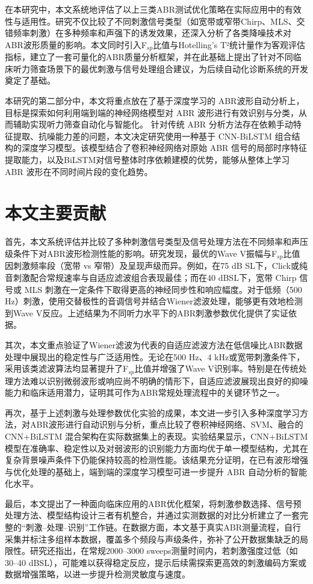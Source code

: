 在本研究中，本文系统地评估了以上三类ABR测试优化策略在实际应用中的有效性与适用性。研究不仅比较了不同刺激信号类型（如宽带或窄带Chirp、MLS、交错频率刺激）在多种频率和声强下的诱发效果，还深入分析了各类降噪技术对ABR波形质量的影响。本文同时引入F$_{sp}$比值与Hotelling's T²统计量作为客观评估指标，建立了一套可量化的ABR质量分析框架，并在此基础上提出了针对不同临床听力筛查场景下的最优刺激与信号处理组合建议，为后续自动化诊断系统的开发奠定了基础。


本研究的第二部分中，本文将重点放在了基于深度学习的 ABR波形自动分析上，目标是探索如何利用端到端的神经网络模型对 ABR 波形进行有效识别与分类，从而辅助实现听力筛查自动化与智能化。
针对传统 ABR 分析方法存在依赖手动特征提取、抗噪能力差的问题，本文决定研究使用一种基于 CNN-BiLSTM 组合结构的深度学习模型。该模型结合了卷积神经网络对原始 ABR 信号的局部时序特征提取能力，以及BiLSTM对信号整体时序依赖建模的优势，能够从整体上学习 ABR 波形在不同时间片段的变化趋势。

\section{本文主要贡献}
首先，本文系统评估并比较了多种刺激信号类型及信号处理方法在不同频率和声压级条件下对ABR波形检测性能的影响。研究发现，最优的Wave V振幅与F$_{sp}$比值因刺激频率段（宽带 vs 窄带）及呈现声级而异。例如，在75 dB SL下，Click或纯音刺激配合常规速率与自适应滤波组合表现最佳；而在40 dBSL下，宽带 Chirp 信号或 MLS 刺激在一定条件下取得更高的神经同步性和响应幅度。对于低频（500 Hz）刺激，使用交替极性的音调信号并结合Wiener滤波处理，能够更有效地检测到Wave V反应。上述结果为不同听力水平下的ABR刺激参数优化提供了实证依据。

其次，本文重点验证了Wiener滤波为代表的自适应滤波方法在低信噪比ABR数据处理中展现出的稳定性与广泛适用性。无论在500 Hz、4 kHz或宽带刺激条件下，采用该类滤波算法均显著提升了F$_{sp}$比值并增强了Wave V识别率。特别是在传统处理方法难以识别微弱波形或响应尚不明确的情形下，自适应滤波展现出良好的抑噪能力和临床适用潜力，证明其可作为ABR常规处理流程中的关键环节之一。

再次，基于上述刺激与处理参数优化实验的成果，本文进一步引入多种深度学习方法，对ABR波形进行自动识别与分析，重点比较了卷积神经网络、SVM、融合的 CNN+BiLSTM 混合架构在实际数据集上的表现。实验结果显示，CNN+BiLSTM模型在准确率、稳定性以及对弱波形的识别能力方面均优于单一模型结构，尤其在复杂背景噪声条件下仍能保持较高的检测性能。该结果充分证明，在已有波形增强与优化处理的基础上，端到端的深度学习模型可进一步提升 ABR 自动分析的智能化水平。


最后，本文提出了一种面向临床应用的ABR优化框架，将刺激参数选择、信号预处理方法、模型结构设计三者有机整合，并通过实测数据的对比分析建立了一套完整的“刺激–处理–识别”工作链。在数据方面，本文基于真实ABR测量流程，自行采集并标注多组样本数据，覆盖多个频段与声级条件，弥补了公开数据集缺乏的局限性。研究还指出，在常规2000–3000 sweeps测量时间内，若刺激强度过低（如30–40 dBSL），可能难以获得稳定反应，提示后续需探索更高效的刺激编码方案或数据增强策略，以进一步提升检测灵敏度与速度。

